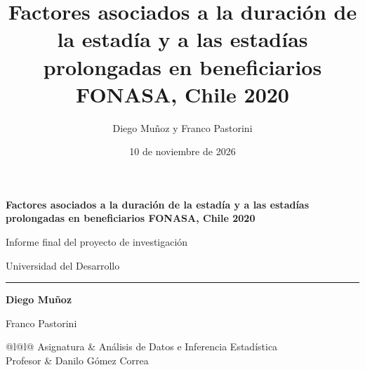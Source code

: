 \documentclass[10.5pt,a4paper,headings=small,abstract=false,bibliography=totoc,listof=totoc]{scrartcl}
\title{Factores asociados a la duración de la estadía y a las estadías prolongadas en beneficiarios FONASA, Chile 2020}
\author{Diego Muñoz y Franco Pastorini}
\date{10 de noviembre de 2026}
\begin{document}
\begin{titlepage}
\thispagestyle{plain}
\raggedright
\vspace*{5.5cm}
{\sffamily\bfseries\color{acento}\fontsize{24}{29}\selectfont Factores asociados a la duración de la estadía y a las estadías prolongadas en beneficiarios FONASA, Chile 2020\par}
\vspace{1.2em}
{\color{gris}\large Informe final del proyecto de investigación\par}
\vspace{0.3em}
{\color{gris}\large Universidad del Desarrollo\par}
\vspace{0.8em}
{\color{filete}\rule{\textwidth}{0.6pt}}\par
\vfill
{\sffamily\bfseries\large Diego Muñoz\par Franco Pastorini\par}
\vspace{1.4em}
{\small
\begin{tabular}{@{}l@{\hspace{1.2em}}l@{}}
\color{gris}Asignatura & Análisis de Datos e Inferencia Estadística \\
\color{gris}Profesor & Danilo Gómez Correa \\
 \\
\end{tabular}\par}
\vspace{1cm}
\end{titlepage}
\setcounter{page}{2}
\end{document}
